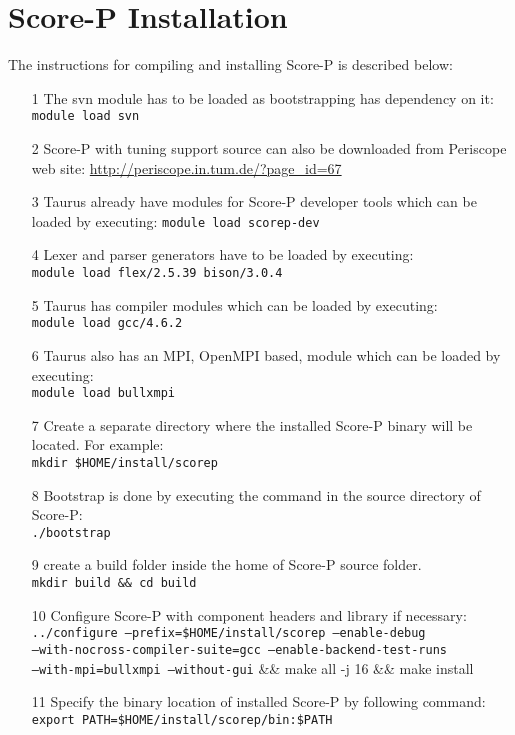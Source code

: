 \documentclass[12pt]{article}
\begin{document}
\section{Score-P Installation}
The instructions for compiling and installing Score-P is described below:
\begin{itemize}
\item[1] The svn module has to be loaded as bootstrapping has dependency on it:\\
\texttt{module load svn} 
\item[2] Score-P with tuning support source can also be downloaded from Periscope
web site: \url{http://periscope.in.tum.de/?page_id=67}
\item[3] Taurus already have modules for Score-P developer tools which can be loaded by executing:
\texttt{module load scorep-dev} 
\item[4] Lexer and parser generators have to be loaded by executing:\\
\texttt{module load flex/2.5.39 bison/3.0.4}
\item[5] Taurus has compiler modules which can be loaded by executing:\\
\texttt{module load gcc/4.6.2}
\item[6] Taurus also has an MPI, OpenMPI based, module which can be loaded by executing:\\
\texttt{module load bullxmpi}
\item[7] Create a separate directory where the installed Score-P binary will be located. For example:\\
\texttt{mkdir \$HOME/install/scorep}
\item[8] Bootstrap is done by executing the command in the source directory of Score-P:\\
\texttt{./bootstrap} 
\item[9] create a build folder inside the home of Score-P source folder.\\
\texttt{mkdir build \&\& cd build}
\item[10] Configure Score-P with component headers and library if necessary:\\
\texttt{../configure --prefix=\$HOME/install/scorep --enable-debug \\
 --with-nocross-compiler-suite=gcc --enable-backend-test-runs \\
 --with-mpi=bullxmpi --without-gui} \&\& make all -j 16 \&\& make install
\item[11] Specify the binary location of installed Score-P by following command:\\
\texttt{export PATH=\$HOME/install/scorep/bin:\$PATH}
\end{itemize}
\end{document}
